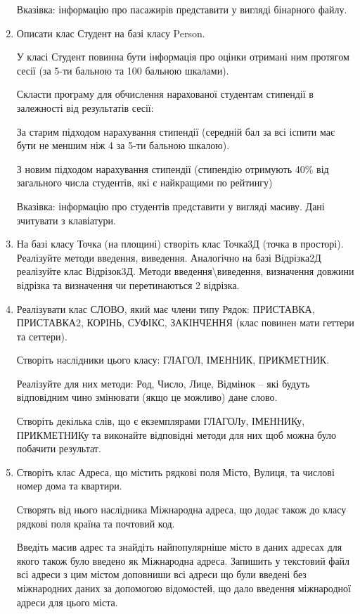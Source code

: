 \documentclass[]{article}
\begin{document}
\begin{enumerate}
Вказівка: інформацію про пасажирів представити у вигляді бінарного
файлу.

\item
Описати клас Студент на базі класу Person.

У класі Студент повинна бути інформація про оцінки отримані ним протягом
сесії (за 5-ти бальною та 100 бальною шкалами).

Скласти програму для обчислення нарахованої студентам стипендії в
залежності від результатів сесії:

За старим підходом нарахування стипендії (середній бал за всі іспити має
бути не меншим ніж 4 за 5-ти бальною шкалою).

З новим підходом нарахування стипендії (стипендію отримують 40\% від
загального числа студентів, які є найкращими по рейтингу)

Вказівка: інформацію про студентів представити у вигляді масиву. Дані
зчитувати з клавіатури.

\item
На базі класу Точка (на площині)
створіть клас Точка3Д (точка в просторі). Реалізуйте методи введення,
виведення. Аналогічно на базі Відрізка2Д реалізуйте клас Відрізок3Д.
Методи введення\textbackslash{}виведення, визначення довжини відрізка та
визначення чи перетинаються 2 відрізка.

\item
Реалізувати клас СЛОВО, який має
члени типу Рядок: ПРИСТАВКА, ПРИСТАВКА2, КОРІНЬ, СУФІКС, ЗАКІНЧЕННЯ
(клас повинен мати геттери та сеттери).

Створіть наслідники цього класу: ГЛАГОЛ, ІМЕННИК, ПРИКМЕТНИК.

Реалізуйте для них методи: Род, Число, Лице, Відмінок -- які будуть
відповідним чино змінювати (якщо це можливо) дане слово.

Створіть декілька слів, що є екземплярами ГЛАГОЛу, ІМЕННИКу, ПРИКМЕТНИКу
та виконайте відповідні методи для них щоб можна було побачити
результат.

\item
Створіть клас Адреса, що містить рядкові поля Місто, Вулиця, та числові
номер дома та квартири.

Створять від нього наслідника Міжнародна адреса, що додає також до класу
рядкові поля країна та почтовий код.

Введіть масив адрес та знайдіть найпопулярніше місто в даних адресах для
якого також було введено як Міжнародна адреса. Запишить у текстовий файл
всі адреси з цим містом доповниши всі адреси що були введені без
міжнародних даних за допомогою відомостей, що дало введення міжнародної
адреси для цього міста.


\end{enumerate}
\end{document}
